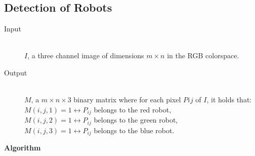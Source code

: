 \documentclass[10pt,a4paper]{article}
\begin{document}
\subsection{Detection of Robots}\label{coloralgo}
\begin{description}
\item[Input] \hfill \\
    $I$, a three channel image of dimensions $m \times n$ in the RGB colorspace.
\item[Output] \hfill \\
    $M$, a $m \times n \times 3$ binary matrix where for each pixel $P{ij}$ of
    $I$, it holds that: \\
    $M(i,j,1) = 1 \leftrightarrow P_{ij}$ belongs to the red robot, \\
    $M(i,j,2) = 1 \leftrightarrow P_{ij}$ belongs to the green robot, \\
    $M(i,j,3) = 1 \leftrightarrow P_{ij}$ belongs to the blue robot.
\end{description}
\textbf{Algorithm}
\end{document}
